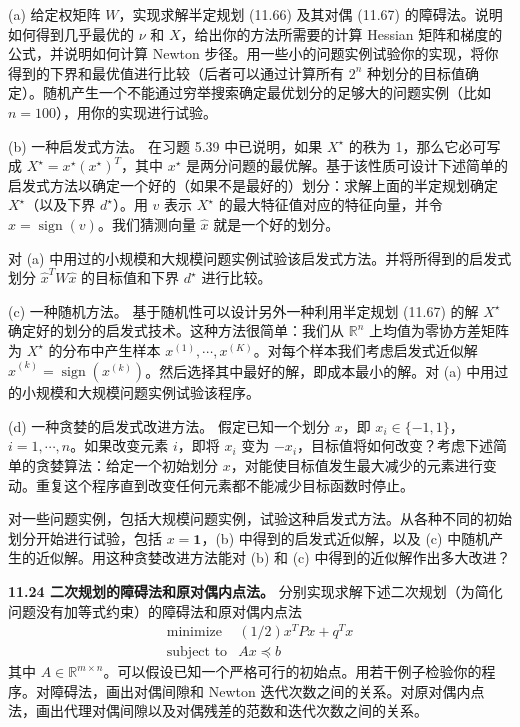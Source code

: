 \documentclass[UTF8, 12pt, fontset=fandol, oneside]{ctexart}
\begin{document}
(a) 给定权矩阵 $W$，实现求解半定规划 (11.66) 及其对偶 (11.67) 的障碍法。说明如何得到几乎最优的 $\nu$ 和 $X$，给出你的方法所需要的计算 Hessian 矩阵和梯度的公式，并说明如何计算 Newton 步径。用一些小的问题实例试验你的实现，将你得到的下界和最优值进行比较（后者可以通过计算所有 $2^n$ 种划分的目标值确定）。随机产生一个不能通过穷举搜索确定最优划分的足够大的问题实例（比如 $n=100$），用你的实现进行试验。

(b) 一种启发式方法。 在习题 5.39 中已说明，如果 $X^\star$ 的秩为 1，那么它必可写成 $X^\star=x^\star(x^\star)^T$，其中 $x^\star$ 是两分问题的最优解。基于该性质可设计下述简单的启发式方法以确定一个好的（如果不是最好的）划分：求解上面的半定规划确定 $X^\star$（以及下界 $d^\star$）。用 $v$ 表示 $X^\star$ 的最大特征值对应的特征向量，并令 $\hat{x}=\operatorname{sign}(v)$。我们猜测向量 $\hat{x}$ 就是一个好的划分。

对 (a) 中用过的小规模和大规模问题实例试验该启发式方法。并将所得到的启发式划分 $\hat{x}^TW\hat{x}$ 的目标值和下界 $d^\star$ 进行比较。

(c) 一种随机方法。 基于随机性可以设计另外一种利用半定规划 (11.67) 的解 $X^\star$ 确定好的划分的启发式技术。这种方法很简单：我们从 $\mathbb{R}^n$ 上均值为零协方差矩阵为 $X^\star$ 的分布中产生样本 $x^{(1)},\cdots,x^{(K)}$。对每个样本我们考虑启发式近似解 $\hat{x}^{(k)}=\operatorname{sign}(x^{(k)})$。然后选择其中最好的解，即成本最小的解。对 (a) 中用过的小规模和大规模问题实例试验该程序。

(d) 一种贪婪的启发式改进方法。 假定已知一个划分 $x$，即 $x_i\in\{-1,1\}$，$i=1,\cdots,n$。如果改变元素 $i$，即将 $x_i$ 变为 $-x_i$，目标值将如何改变？考虑下述简单的贪婪算法：给定一个初始划分 $x$，对能使目标值发生最大减少的元素进行变动。重复这个程序直到改变任何元素都不能减少目标函数时停止。

对一些问题实例，包括大规模问题实例，试验这种启发式方法。从各种不同的初始划分开始进行试验，包括 $x=\mathbf{1}$，(b) 中得到的启发式近似解，以及 (c) 中随机产生的近似解。用这种贪婪改进方法能对 (b) 和 (c) 中得到的近似解作出多大改进？

\noindent\textbf{11.24 二次规划的障碍法和原对偶内点法。} 分别实现求解下述二次规划（为简化问题没有加等式约束）的障碍法和原对偶内点法
\[
\begin{array}{ll}
\text{minimize} & (1/2)x^TPx+q^Tx\\
\text{subject to} & Ax\preceq b
\end{array}
\]
其中 $A\in\mathbb{R}^{m\times n}$。可以假设已知一个严格可行的初始点。用若干例子检验你的程序。对障碍法，画出对偶间隙和 Newton 迭代次数之间的关系。对原对偶内点法，画出代理对偶间隙以及对偶残差的范数和迭代次数之间的关系。
\end{document}
